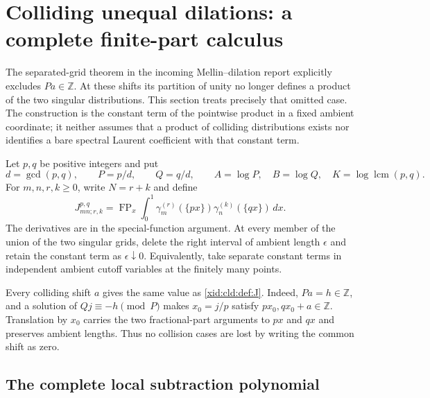 
\section{Colliding unequal dilations: a complete finite-part calculus}
\label{xid:cld:section}

The separated-grid theorem in the incoming Mellin--dilation report
\cite{IncomingMellin}
explicitly excludes $Pa\in\mathbb Z$.  At these shifts its partition of
unity no longer defines a product of the two singular distributions.
This section treats precisely that omitted case.  The construction is
the constant term of the pointwise product in a fixed ambient coordinate;
it neither assumes that a product of colliding distributions exists nor
identifies a bare spectral Laurent coefficient with that constant term.

Let $p,q$ be positive integers and put
\[
 d=\gcd(p,q),\qquad P=p/d,\qquad Q=q/d,\qquad
 A=\log P,\quad B=\log Q,\quad
 K=\log\operatorname{lcm}(p,q).
\]
For $m,n,r,k\ge0$, write $N=r+k$ and define
\begin{equation}
 J_{mn;r,k}^{p,q}
 =\operatorname{FP}_x\int_0^1
       \gamma_m^{(r)}(\{px\})\gamma_n^{(k)}(\{qx\})\,dx.
 \label{xid:cld:def:J}
\end{equation}
The derivatives are in the special-function argument.  At every member
of the union of the two singular grids, delete the right interval of
ambient length $\epsilon$ and retain the constant term as
$\epsilon\downarrow0$.  Equivalently, take separate constant terms in
independent ambient cutoff variables at the finitely many points.

Every colliding shift $a$ gives the same value as \eqref{xid:cld:def:J}.
Indeed, $Pa=h\in\mathbb Z$, and a solution of
$Qj\equiv-h\pmod P$ makes $x_0=j/p$ satisfy
$px_0,qx_0+a\in\mathbb Z$.  Translation by $x_0$ carries the two
fractional-part arguments to $px$ and $qx$ and preserves ambient lengths.
Thus no collision cases are lost by writing the common shift as zero.

\subsection{The complete local subtraction polynomial}


